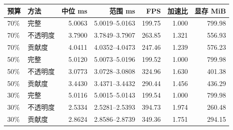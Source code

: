 \begin{center}
\small
\begin{tabular}{llrrrrr}
\toprule
预算 & 方法 & 中位 ms & 范围 ms & FPS & 加速比 & 显存 MiB \\
\midrule
70\% & 完整 & 5.0063 & 5.0019--5.0163 & 199.75 & 1.000 & 799.98 \\
70\% & 不透明度 & 3.7900 & 3.7849--3.7907 & 263.85 & 1.321 & 556.93 \\
70\% & 贡献度 & 4.0411 & 4.0352--4.0473 & 247.46 & 1.239 & 576.23 \\
50\% & 完整 & 5.0120 & 5.0073--5.0196 & 199.52 & 1.000 & 799.98 \\
50\% & 不透明度 & 3.0773 & 3.0728--3.0808 & 324.96 & 1.630 & 401.38 \\
50\% & 贡献度 & 3.4430 & 3.4371--3.4432 & 290.44 & 1.456 & 436.29 \\
30\% & 完整 & 5.0116 & 5.0015--5.0143 & 199.54 & 1.000 & 799.98 \\
30\% & 不透明度 & 2.5334 & 2.5281--2.5393 & 394.73 & 1.974 & 260.48 \\
30\% & 贡献度 & 2.8624 & 2.8586--2.8739 & 349.36 & 1.751 & 294.15 \\
\bottomrule
\end{tabular}
\end{center}
